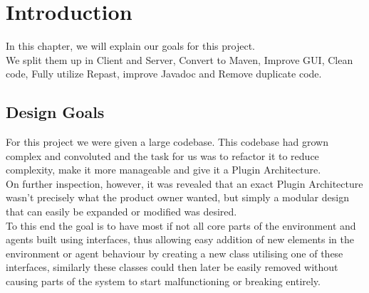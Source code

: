 \chapter{Introduction}

  In this chapter, we will explain our goals for this project. \\
  We split them up in Client and Server, Convert to Maven, Improve GUI, Clean code, Fully utilize Repast, improve Javadoc and Remove duplicate code.

\section{Design Goals}
For this project we were given a large codebase. This codebase had grown complex and convoluted and the task for us was to refactor it to reduce complexity, make it more manageable and give it a Plugin Architecture. \\
On further inspection, however, it was revealed that an exact Plugin Architecture wasn't precisely what the product owner wanted, but simply a modular design that can easily be expanded or modified was desired. \\
To this end the goal is to have most if not all core parts of the environment and agents built using interfaces, thus allowing easy addition of new elements in the environment or agent behaviour by creating a new class utilising one of these interfaces, similarly these classes could then later be easily removed without causing parts of the system to start malfunctioning or breaking entirely. \\

